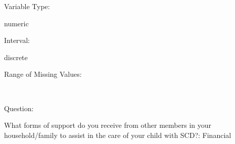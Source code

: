 \documentclass[
]{article}
\begin{document}
\begin{minipage}[t]{0.3\linewidth}

Variable Type:

\end{minipage}%
\begin{minipage}[t]{0.7\linewidth}

numeric

\end{minipage}

\begin{minipage}[t]{0.3\linewidth}

Interval:

\end{minipage}%
\begin{minipage}[t]{0.7\linewidth}

discrete

\end{minipage}

\begin{minipage}[t]{0.3\linewidth}

Range of Missing Values:

\end{minipage}%
\begin{minipage}[t]{0.7\linewidth}

~

\end{minipage}

\begin{minipage}[t]{0.3\linewidth}

Question:

\end{minipage}%
\begin{minipage}[t]{0.7\linewidth}

What forms of support do you receive from other members in your
household/family to assist in the care of your child with SCD?:
Financial

\end{minipage}
\end{document}
